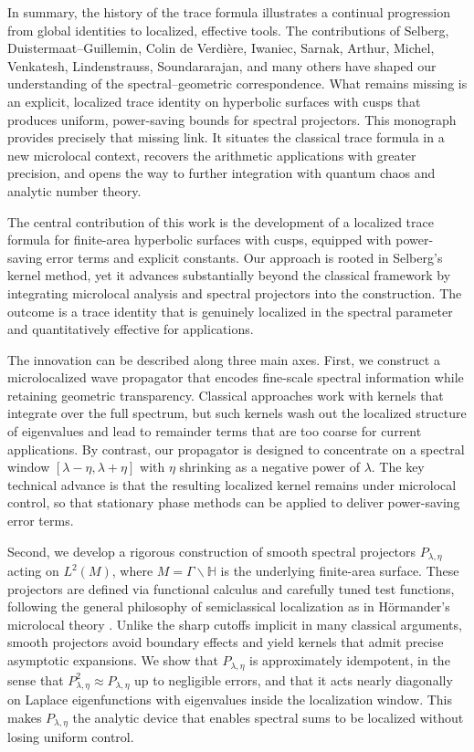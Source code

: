 In summary, the history of the trace formula illustrates a continual progression
from global identities to localized, effective tools. The contributions of
Selberg, Duistermaat–Guillemin, Colin de Verdière, Iwaniec, Sarnak, Arthur,
Michel, Venkatesh, Lindenstrauss, Soundararajan, and many others have shaped
our understanding of the spectral–geometric correspondence. What remains
missing is an explicit, localized trace identity on hyperbolic surfaces with
cusps that produces uniform, power-saving bounds for spectral projectors. This
monograph provides precisely that missing link. It situates the classical trace
formula in a new microlocal context, recovers the arithmetic applications with
greater precision, and opens the way to further integration with quantum chaos
and analytic number theory.

The central contribution of this work is the development of a localized trace
formula for finite-area hyperbolic surfaces with cusps, equipped with
power-saving error terms and explicit constants. Our approach is rooted in
Selberg’s kernel method, yet it advances substantially beyond the classical
framework by integrating microlocal analysis and spectral projectors into the
construction. The outcome is a trace identity that is genuinely localized in
the spectral parameter and quantitatively effective for applications.

The innovation can be described along three main axes. First, we construct a
microlocalized wave propagator that encodes fine-scale spectral information
while retaining geometric transparency. Classical approaches work with kernels
that integrate over the full spectrum, but such kernels wash out the localized
structure of eigenvalues and lead to remainder terms that are too coarse for
current applications. By contrast, our propagator is designed to concentrate on
a spectral window $[\lambda-\eta,\lambda+\eta]$ with $\eta$ shrinking as a
negative power of $\lambda$. The key technical advance is that the resulting
localized kernel remains under microlocal control, so that stationary phase
methods can be applied to deliver power-saving error terms.

Second, we develop a rigorous construction of smooth spectral projectors
$P_{\lambda,\eta}$ acting on $L^2(M)$, where $M=\Gamma\backslash\mathbb{H}$ is
the underlying finite-area surface. These projectors are defined via functional
calculus and carefully tuned test functions, following the general philosophy
of semiclassical localization as in Hörmander’s microlocal theory
\cite{HormanderPDO,ZworskiSemiclassical}. Unlike the sharp cutoffs implicit in
many classical arguments, smooth projectors avoid boundary effects and yield
kernels that admit precise asymptotic expansions. We show that
$P_{\lambda,\eta}$ is approximately idempotent, in the sense that
$P_{\lambda,\eta}^2 \approx P_{\lambda,\eta}$ up to negligible errors, and that
it acts nearly diagonally on Laplace eigenfunctions with eigenvalues inside the
localization window. This makes $P_{\lambda,\eta}$ the analytic device that
enables spectral sums to be localized without losing uniform control.


